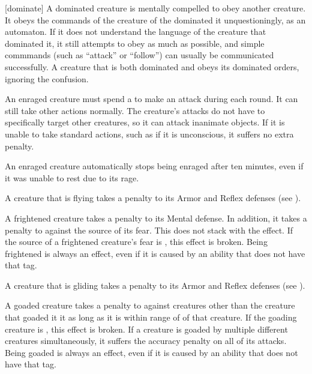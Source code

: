   [dominate] A dominated creature is mentally compelled to obey another creature.
  It obeys the commands of the creature of the dominated it unquestioningly, as an automaton.
  If it does not understand the language of the creature that dominated it, it still attempts to obey as much as possible, and simple commmands (such as ``attack'' or ``follow'') can usually be communicated successfully.
  A creature that is both dominated and \confused obeys its dominated orders, ignoring the confusion.

   An enraged creature must spend a  to make an attack during each round.
  It can still take other actions normally.
  The creature's attacks do not have to specifically target other creatures, so it can attack inanimate objects.
  If it is unable to take standard actions, such as if it is unconscious, it suffers no extra penalty.

  An enraged creature automatically stops being enraged after ten minutes, even if it was unable to rest due to its rage.

   A creature that is flying takes a  penalty to its Armor and Reflex defenses (see ).

   A frightened creature takes a  penalty to its Mental defense.
  In addition, it takes a  penalty to  against the source of its fear.
  This does not stack with the \panicked effect.
  If the source of a frightened creature's fear is , this effect is broken.
  Being frightened is always an  effect, even if it is caused by an ability that does not have that tag.

   A creature that is gliding takes a  penalty to its Armor and Reflex defenses (see ).

   A goaded creature takes a  penalty to  against creatures other than the creature that goaded it it as long as it is within \rngmed range of of that creature.
  If the goading creature is , this effect is broken.
  If a creature is goaded by multiple different creatures simultaneously, it suffers the accuracy penalty on all of its attacks.
  Being goaded is always an  effect, even if it is caused by an ability that does not have that tag.


